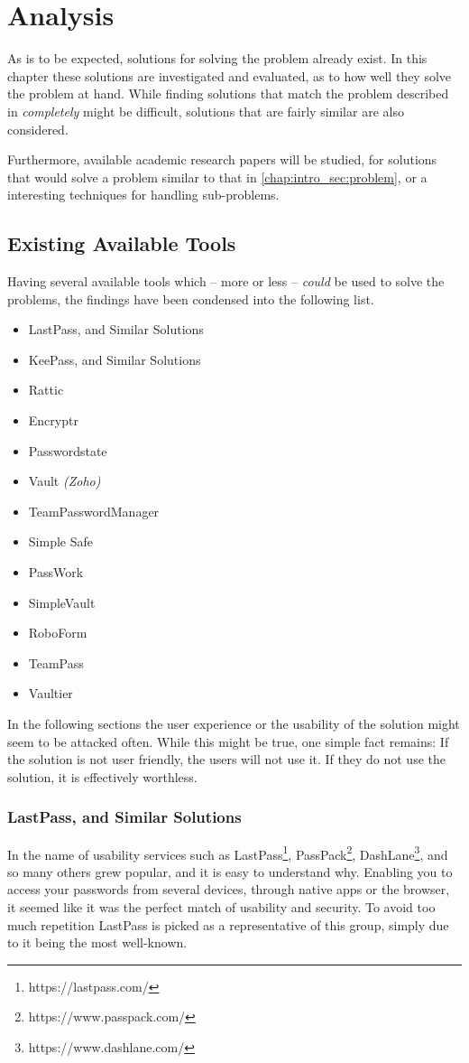 \chapter{Analysis}
\label{chap:analysis}
	As is to be expected, solutions for solving the problem already exist. In this chapter these solutions are investigated and evaluated, as to how well they solve the problem at hand. While finding solutions that match the problem described in  \emph{completely} might be difficult, solutions that are fairly similar are also considered.

	Furthermore, available academic research papers will be studied, for solutions that would solve a problem similar to that in \ref{chap:intro_sec:problem}, or a interesting techniques for handling sub-problems.

	\section{Existing Available Tools}
		Having several available tools which -- more or less -- \emph{could} be used to solve the problems, the findings have been condensed into the following list.
		\begin{itemize}
			\item LastPass, and Similar Solutions
			\item KeePass, and Similar Solutions
			\item Rattic
			\item Encryptr
			\item Passwordstate
			\item Vault \emph{(Zoho)}
			\item TeamPasswordManager
			\item Simple Safe
			\item PassWork
			\item SimpleVault
			\item RoboForm
			\item TeamPass 
			\item Vaultier
		\end{itemize}
		In the following sections the user experience or the usability of the solution might seem to be attacked often. While this might be true, one simple fact remains: If the solution is not user friendly, the users will not use it. If they do not use the solution, it is effectively worthless.

		\subsection*{LastPass, and Similar Solutions}
			\label{subsec:lastpass}
			In the name of usability services such as LastPass\footnote{https://lastpass.com/}, PassPack\footnote{https://www.passpack.com/}, DashLane\footnote{https://www.dashlane.com/}, and so many others grew popular, and it is easy to understand why. Enabling you to access your passwords from several devices, through native apps or the browser, it seemed like it was the perfect match of usability and security. To avoid too much repetition LastPass is picked as a representative of this group, simply due to it being the most well-known.

